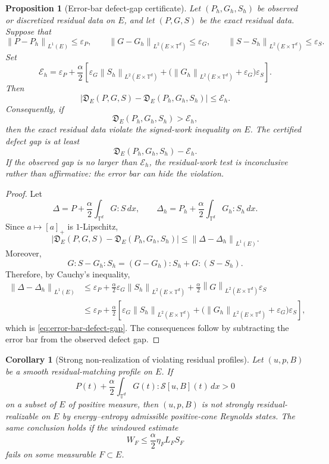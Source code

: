 \documentclass[11pt]{article}
\numberwithin{equation}{section}
\newtheorem{proposition}[theorem]{Proposition}
\newtheorem{corollary}[theorem]{Corollary}
\newcommand{\T}{\mathbb T}
\newcommand{\norm}[1]{\left\lVert #1\right\rVert}
\begin{document}
\begin{proposition}[Error-bar defect-gap certificate]
\label{prop:error-bar-defect-gap}
Let \((P_h,G_h,S_h)\) be observed or discretized residual data on \(E\), and
let \((P,G,S)\) be the exact residual data.  Suppose that
\[
  \norm{P-P_h}_{L^1(E)}\le\varepsilon_P,\qquad
  \norm{G-G_h}_{L^2(E\times\T^d)}\le\varepsilon_G,\qquad
  \norm{S-S_h}_{L^2(E\times\T^d)}\le\varepsilon_S .
\]
Set
\[
  \mathcal E_h
  =
  \varepsilon_P
  +\frac{\alpha}{2}
  \left[
    \varepsilon_G\norm{S_h}_{L^2(E\times\T^d)}
    +\bigl(\norm{G_h}_{L^2(E\times\T^d)}+\varepsilon_G\bigr)
     \varepsilon_S
  \right].
\]
Then
\begin{equation}
  \left|
  \mathfrak D_E(P,G,S)-\mathfrak D_E(P_h,G_h,S_h)
  \right|
  \le\mathcal E_h .
  \label{eq:error-bar-defect-gap}
\end{equation}
Consequently, if
\[
  \mathfrak D_E(P_h,G_h,S_h)>\mathcal E_h,
\]
then the exact residual data violate the signed-work inequality on \(E\).  The
certified defect gap is at least
\[
  \mathfrak D_E(P_h,G_h,S_h)-\mathcal E_h .
\]
If the observed gap is no larger than \(\mathcal E_h\), the residual-work test
is inconclusive rather than affirmative: the error bar can hide the violation.
\end{proposition}

\begin{proof}
Let
\[
  \Delta=P+\frac{\alpha}{2}\int_{\T^d}G:S\,dx,
  \qquad
  \Delta_h=P_h+\frac{\alpha}{2}\int_{\T^d}G_h:S_h\,dx .
\]
Since \(a\mapsto[a]_+\) is \(1\)-Lipschitz,
\[
  \left|\mathfrak D_E(P,G,S)-\mathfrak D_E(P_h,G_h,S_h)\right|
  \le \norm{\Delta-\Delta_h}_{L^1(E)} .
\]
Moreover,
\[
  G:S-G_h:S_h=(G-G_h):S_h+G:(S-S_h).
\]
Therefore, by Cauchy's inequality,
\[
\begin{aligned}
  \norm{\Delta-\Delta_h}_{L^1(E)}
  &\le
  \varepsilon_P
  +\frac{\alpha}{2}
  \varepsilon_G\norm{S_h}_{L^2(E\times\T^d)}
  +\frac{\alpha}{2}
  \norm{G}_{L^2(E\times\T^d)}\varepsilon_S\\
  &\le
  \varepsilon_P
  +\frac{\alpha}{2}
  \left[
    \varepsilon_G\norm{S_h}_{L^2(E\times\T^d)}
    +\bigl(\norm{G_h}_{L^2(E\times\T^d)}+\varepsilon_G\bigr)
     \varepsilon_S
  \right],
\end{aligned}
\]
which is \eqref{eq:error-bar-defect-gap}.  The consequences follow by
subtracting the error bar from the observed defect gap.
\end{proof}

\begin{corollary}[Strong non-realization of violating residual profiles]
\label{cor:strong-nonrealization}
Let \((u,p,B)\) be a smooth residual-matching profile on \(E\).  If
\[
  P(t)+\frac{\alpha}{2}\int_{\T^d}G(t):\mathcal S[u,B](t)\,dx>0
\]
on a subset of \(E\) of positive measure, then \((u,p,B)\) is not strongly
residual-realizable on \(E\) by energy--entropy admissible positive-cone
Reynolds states.  The same conclusion holds if the windowed estimate
\[
  W_F\le \frac{\alpha}{2}\eta_F L_FS_F
\]
fails on some measurable \(F\subset E\).
\end{corollary}
\end{document}
